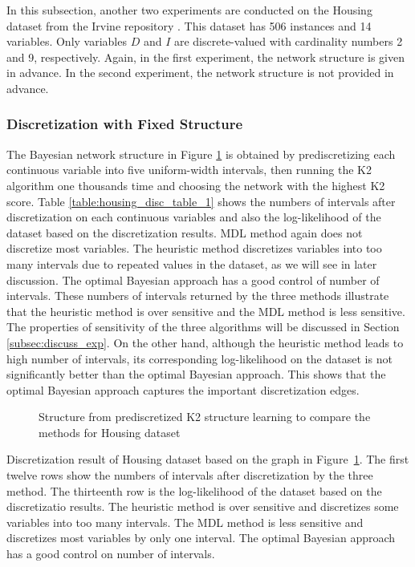 In this subsection, another two experiments are conducted on the Housing dataset from the Irvine repository \citep{Lichman_2013}. This dataset has 506 instances and 14 variables. Only variables $D$ and $I$ are discrete-valued with cardinality numbers 2 and 9, respectively. Again, in the first experiment, the network structure is given in advance. In the second experiment, the network structure is not provided in advance.

\subsubsection{Discretization with Fixed Structure}
\label{subsubsec:housing_exp1}

The Bayesian network structure in Figure \ref{fig:housing_graph_1} is obtained by prediscretizing each continuous variable into five uniform-width intervals, then running the K2 algorithm one thousands time and choosing the network with the highest K2 score. Table \ref{table:housing_disc_table_1} shows the numbers of intervals after discretization on each continuous variables and also the log-likelihood of the dataset based on the discretization results. MDL method again does not discretize most variables. The heuristic method discretizes variables into too many intervals due to repeated values in the dataset, as we will see in later discussion. The optimal Bayesian approach has a good control of number of intervals. These numbers of intervals returned by the three methods illustrate that the heuristic method is over sensitive and the MDL method is less sensitive. The properties of sensitivity of the three algorithms will be discussed in Section \ref{subsec:discuss_exp}. On the other hand, although the heuristic method leads to high number of intervals, its corresponding log-likelihood on the dataset is not significantly better than the optimal Bayesian approach. This shows that the optimal Bayesian approach captures the important discretization edges.

\begin{figure}[ht]
  \centering
  \scalebox{0.8}{
   }
  \caption{Structure from prediscretized K2 structure learning to compare the methods for Housing dataset}
  \label{fig:housing_graph_1}
\end{figure}


\begin{table}
  \centering
  \caption{Discretization result of Housing dataset based on the graph in Figure~\ref{fig:housing_graph_1}. The first twelve rows show the numbers of intervals after discretization by the three method. The thirteenth row is the log-likelihood of the dataset based on the discretizatio results. The heuristic method is over sensitive and discretizes some variables into too many intervals. The MDL method is less sensitive and discretizes most variables by only one interval. The optimal Bayesian approach has a good control on number of intervals. }
  \scalebox{1.0}{
  
  }

  \label{table:housing_disc_table_1}
\end{table}

